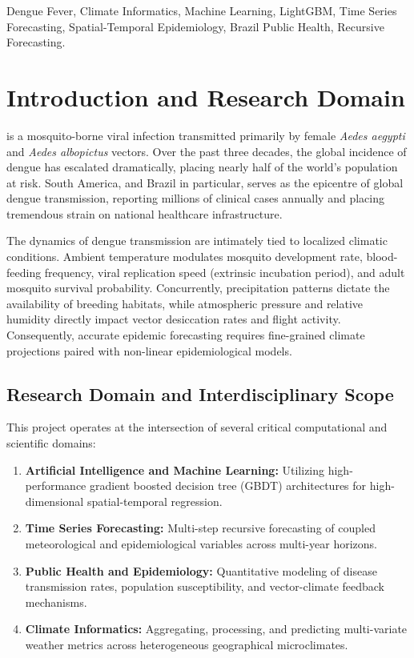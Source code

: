 \documentclass[journal,onecolumn,11pt]{IEEEtran}
\begin{document}
\begin{IEEEkeywords}
Dengue Fever, Climate Informatics, Machine Learning, LightGBM, Time Series Forecasting, Spatial-Temporal Epidemiology, Brazil Public Health, Recursive Forecasting.
\end{IEEEkeywords}

\IEEEpeerreviewmaketitle

\section{Introduction and Research Domain}
 is a mosquito-borne viral infection transmitted primarily by female \textit{Aedes aegypti} and \textit{Aedes albopictus} vectors. Over the past three decades, the global incidence of dengue has escalated dramatically, placing nearly half of the world's population at risk. South America, and Brazil in particular, serves as the epicentre of global dengue transmission, reporting millions of clinical cases annually and placing tremendous strain on national healthcare infrastructure.

The dynamics of dengue transmission are intimately tied to localized climatic conditions. Ambient temperature modulates mosquito development rate, blood-feeding frequency, viral replication speed (extrinsic incubation period), and adult mosquito survival probability. Concurrently, precipitation patterns dictate the availability of breeding habitats, while atmospheric pressure and relative humidity directly impact vector desiccation rates and flight activity. Consequently, accurate epidemic forecasting requires fine-grained climate projections paired with non-linear epidemiological models.

\subsection{Research Domain and Interdisciplinary Scope}
This project operates at the intersection of several critical computational and scientific domains:
\begin{enumerate}
    \item \textbf{Artificial Intelligence and Machine Learning:} Utilizing high-performance gradient boosted decision tree (GBDT) architectures for high-dimensional spatial-temporal regression.
    \item \textbf{Time Series Forecasting:} Multi-step recursive forecasting of coupled meteorological and epidemiological variables across multi-year horizons.
    \item \textbf{Public Health and Epidemiology:} Quantitative modeling of disease transmission rates, population susceptibility, and vector-climate feedback mechanisms.
    \item \textbf{Climate Informatics:} Aggregating, processing, and predicting multi-variate weather metrics across heterogeneous geographical microclimates.
\end{enumerate}
\end{document}
